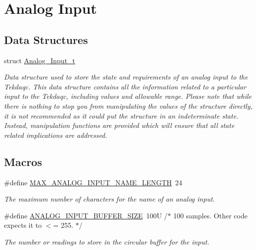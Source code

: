 \hypertarget{group__analog__input}{\section{Analog Input}
\label{group__analog__input}
}
\subsection*{Data Structures}
\begin{DoxyCompactItemize}
\item 
struct \hyperlink{struct_analog___input__t}{Analog\-\_\-\-Input\-\_\-t}
\begin{DoxyCompactList}\small\item\em Data structure used to store the state and requirements of an analog input to the Tekdaqc. This data structure contains all the information related to a particular input to the Tekdaqc, including values and allowable range. Please note that while there is nothing to stop you from manipulating the values of the structure directly, it is not recommended as it could put the structure in an indeterminate state. Instead, manipulation functions are provided which will ensure that all state related implications are addressed. \end{DoxyCompactList}\end{DoxyCompactItemize}
\subsection*{Macros}
\begin{DoxyCompactItemize}
\item 
\hypertarget{group__analog__input_ga7b523129daacaeca69045b3adb1aaf54}{\#define \hyperlink{group__analog__input_ga7b523129daacaeca69045b3adb1aaf54}{M\-A\-X\-\_\-\-A\-N\-A\-L\-O\-G\-\_\-\-I\-N\-P\-U\-T\-\_\-\-N\-A\-M\-E\-\_\-\-L\-E\-N\-G\-T\-H}~24}\label{group__analog__input_ga7b523129daacaeca69045b3adb1aaf54}

\begin{DoxyCompactList}\small\item\em The maximum number of characters for the name of an analog input. \end{DoxyCompactList}\item 
\hypertarget{group__analog__input_ga3f128795c69a685d5e905c4117008271}{\#define \hyperlink{group__analog__input_ga3f128795c69a685d5e905c4117008271}{A\-N\-A\-L\-O\-G\-\_\-\-I\-N\-P\-U\-T\-\_\-\-B\-U\-F\-F\-E\-R\-\_\-\-S\-I\-Z\-E}~100\-U /$\ast$ 100 samples. Other code expects it to $<$= 255. $\ast$/}\label{group__analog__input_ga3f128795c69a685d5e905c4117008271}

\begin{DoxyCompactList}\small\item\em The number or readings to store in the circular buffer for the input. \end{DoxyCompactList}\end{DoxyCompactItemize}
